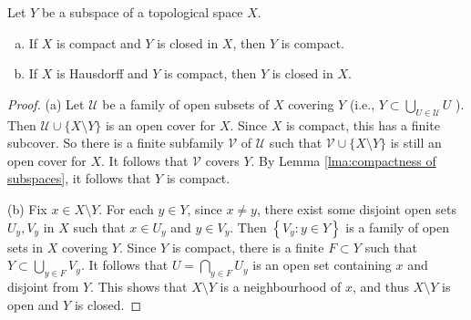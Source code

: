 \documentclass[a4paper]{article}
\begin{document}
\begin{proposition}\label{prop:compact close -> compact; Hausdorff compact -> closed}
    Let $Y$ be a subspace of a topological space $X$.
    \begin{enumerate}[(a)]
        \item If $X$ is compact and $Y$ is closed in $X$, then $Y$ is compact.
        \item If $X$ is Hausdorff and $Y$ is compact, then $Y$ is closed in $X$.
    \end{enumerate}
\end{proposition}
\begin{proof}
    (a) Let $\mathcal{U}$ be a family of open subsets of $X$ covering $Y$ (i.e., $Y \subset \bigcup_{U \in \mathcal{U}} U$ ). Then $\mathcal{U} \cup\{X \setminus Y\}$ is an open cover for $X$. Since $X$ is compact, this has a finite subcover. So there is a finite subfamily $\mathcal{V}$ of $\mathcal{U}$ such that $\mathcal{V} \cup\{X \setminus Y\}$ is still an open cover for $X$. It follows that $\mathcal{V}$ covers $Y$. By Lemma \ref{lma:compactness of subspaces}, it follows that $Y$ is compact.

(b) Fix $x \in X \setminus Y$. For each $y \in Y$, since $x \neq y$, there exist some disjoint open sets $U_{y}, V_{y}$ in $X$ such that $x \in U_{y}$ and $y \in V_{y}$. Then $\left\{V_{y}: y \in Y\right\}$ is a family of open sets in $X$ covering $Y$. Since $Y$ is compact, there is a finite $F \subset Y$ such that $Y \subset \bigcup_{y \in F} V_{y}$. It follows that $U=\bigcap_{y \in F} U_{y}$ is an open set containing $x$ and disjoint from $Y$. This shows that $X \setminus Y$ is a neighbourhood of $x$, and thus $X \setminus Y$ is open and $Y$ is closed.
\end{proof}
\end{document}
